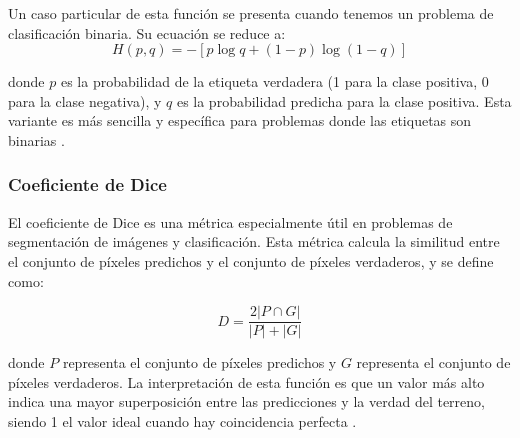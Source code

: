 Un caso particular de esta función se presenta cuando tenemos un problema de clasificación binaria. Su ecuación se reduce a: 
\begin{equation}
    H(p, q) = - \left[ p \log q + (1 - p) \log (1 - q) \right]
\end{equation}

donde \(p\) es la probabilidad de la etiqueta verdadera (1 para la clase positiva, 0 para la clase negativa), y \(q\) es la probabilidad predicha para la clase positiva. Esta variante es más sencilla y específica para problemas donde las etiquetas son binarias \citep{pajares2021aprendizaje}.


\subsubsection{Coeficiente de Dice}

El coeficiente de Dice es una métrica especialmente útil en problemas de segmentación de imágenes y clasificación. Esta métrica calcula la similitud entre el conjunto de píxeles predichos y el conjunto de píxeles verdaderos, y se define como:

\begin{equation}
    D = \frac{2 |P \cap G|}{|P| + |G|}
\end{equation}

donde \(P\) representa el conjunto de píxeles predichos y \(G\) representa el conjunto de píxeles verdaderos. La interpretación de esta función es que un valor más alto indica una mayor superposición entre las predicciones y la verdad del terreno, siendo 1 el valor ideal cuando hay coincidencia perfecta \cite{pajares2021aprendizaje}.

